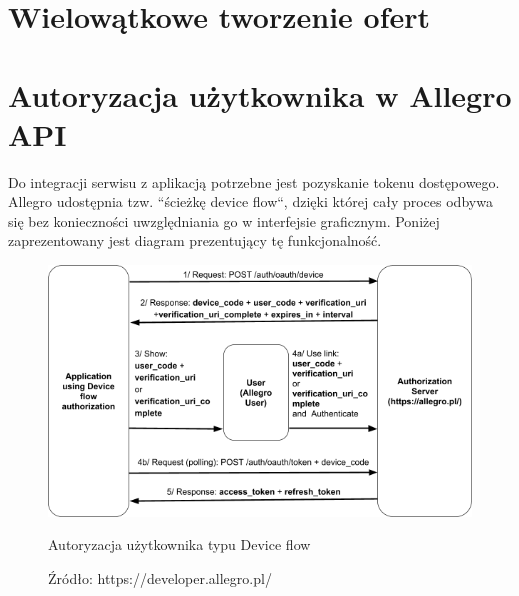 
\section{Wielowątkowe tworzenie ofert}


\section{Autoryzacja użytkownika w Allegro API}

Do integracji serwisu z aplikacją potrzebne jest pozyskanie tokenu dostępowego. Allegro udostępnia tzw. ``ścieżkę device flow``, dzięki której cały proces odbywa się bez konieczności uwzględniania go w interfejsie graficznym. Poniżej zaprezentowany jest diagram prezentujący tę funkcjonalność.\\

\begin{figure}[H]
	\centering
	\includegraphics[width=\linewidth]{device_flow.png}
	\caption{Autoryzacja użytkownika typu Device flow}
	\caption*{Źródło: {https://developer.allegro.pl/}}
\end{figure}

